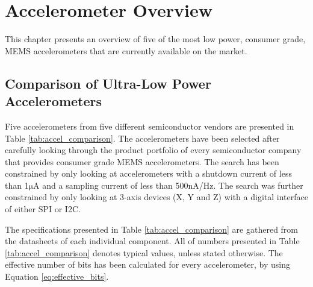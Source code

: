 \chapter{Accelerometer Overview}
\label{chap:overview}

This chapter presents an overview of five of the most low power, consumer grade, MEMS accelerometers that are currently available on the market.

\section{Comparison of Ultra-Low Power Accelerometers}

Five accelerometers from five different semiconductor vendors are presented in Table \ref{tab:accel_comparison}. The accelerometers have been selected after carefully looking through the product portfolio of every semiconductor company that provides consumer grade MEMS accelerometers. The search has been constrained by only looking at accelerometers with a shutdown current of less than 1$\si{\micro\ampere}$ and a sampling current of less than 500$\si{\nano\ampere}$/Hz. The search was further constrained by only looking at 3-axis devices (X, Y and Z) with a digital interface of either SPI or I2C.

The specifications presented in Table \ref{tab:accel_comparison} are gathered from the datasheets of each individual component. All of numbers presented in Table \ref{tab:accel_comparison} denotes typical values, unless stated otherwise. The effective number of bits has been calculated for every accelerometer, by using Equation \ref{eq:effective_bits}.

